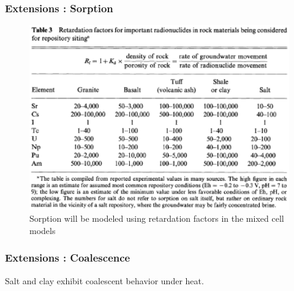 \begin{frame}[ctb!]
  \frametitle{Extensions : Sorption}
  \begin{figure}[h!]
      \includegraphics[height=.8\textheight]{sorptionKrauskopf.eps}
    \caption{Sorption will be modeled using retardation factors in the mixed 
    cell models \cite{krauskopf_geology_1988.}}
    \label{fig:sorptionKrauskopf}
  \end{figure}
\end{frame}


\begin{frame}[ctb!]
  \frametitle{Extensions : Coalescence}
  Salt and clay exhibit coalescent behavior under heat.
\end{frame}


